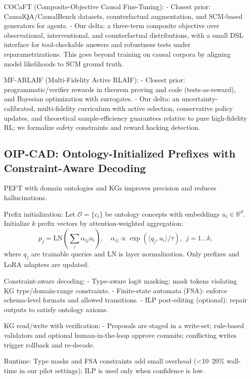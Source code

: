 \documentclass{article}
\begin{document}
COCaFT (Composite-Objective Causal Fine-Tuning):
- Closest prior: CausalQA/CausalBench datasets, counterfactual augmentation, and SCM-based generators for agents.
- Our delta: a three-term composite objective over observational, interventional, and counterfactual distributions, with a small DSL interface for tool-checkable answers and robustness tests under reparametrizations. This goes beyond training on causal corpora by aligning model likelihoods to SCM ground truth.

MF-ARLAIF (Multi-Fidelity Active RLAIF):
- Closest prior: programmatic/verifier rewards in theorem proving \cite{polu2023formal} and code (tests-as-reward), and Bayesian optimization with surrogates.
- Our delta: an uncertainty-calibrated, multi-fidelity curriculum with active selection, conservative policy updates, and theoretical sample-efficiency guarantees relative to pure high-fidelity RL; we formalize safety constraints and reward hacking detection.

\subsection{OIP-CAD: Ontology-Initialized Prefixes with Constraint-Aware Decoding}
PEFT with domain ontologies and KGs improves precision and reduces hallucinations.

Prefix initialization:
Let $\mathcal{O}=\{c_i\}$ be ontology concepts with embeddings $u_i\in\mathbb{R}^d$. Initialize $k$ prefix vectors by attention-weighted aggregation:
\begin{equation}
p_j = \mathrm{LN}\left(\sum_i \alpha_{ij} u_i\right), \quad \alpha_{ij} \propto \exp\left(\langle q_j, u_i\rangle/\tau\right), \ \ j=1\ldots k,
\end{equation}
where $q_j$ are trainable queries and LN is layer normalization. Only prefixes and LoRA adapters are updated.

Constraint-aware decoding:
- Type-aware logit masking: mask tokens violating KG type/domain-range constraints.
- Finite-state automata (FSA): enforce schema-level formats and allowed transitions.
- ILP post-editing (optional): repair outputs to satisfy ontology axioms.

KG read/write with verification:
- Proposals are staged in a write-set; rule-based validators and optional human-in-the-loop approve commits; conflicting writes trigger rollback and re-decode.

Runtime:
Type masks and FSA constraints add small overhead (<10–20\% wall-time in our pilot settings); ILP is used only when confidence is low.
\end{document}
